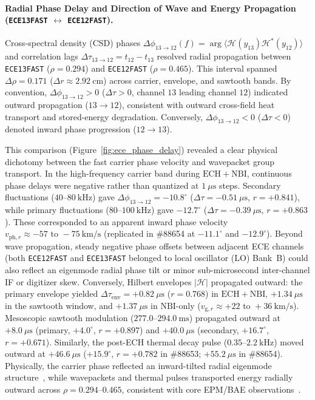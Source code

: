 \paragraph*{Radial Phase Delay and Direction of Wave and Energy Propagation (\texttt{ECE13FAST} \texorpdfstring{$\leftrightarrow$}{<->} \texttt{ECE12FAST}).}
Cross-spectral density (CSD) phases $\Delta\phi_{13\to 12}(f) = \arg\langle \mathcal{H}(y_{13})\mathcal{H}^*(y_{12})\rangle$ and correlation lags $\Delta\tau_{13\to 12} = t_{12} - t_{13}$ resolved radial propagation between \texttt{ECE13FAST} ($\rho = 0.294$) and \texttt{ECE12FAST} ($\rho = 0.465$). This interval spanned $\Delta\rho = 0.171$ ($\Delta r \approx 2.92~\mathrm{cm}$) across carrier, envelope, and sawtooth bands. By convention, $\Delta\phi_{13\to 12} > 0$ ($\Delta\tau > 0$, channel $13$ leading channel $12$) indicated outward propagation ($13 \to 12$), consistent with outward cross-field heat transport and stored-energy degradation. Conversely, $\Delta\phi_{13\to 12} < 0$ ($\Delta\tau < 0$) denoted inward phase progression ($12 \to 13$).

This comparison (Figure~\ref{fig:ece_phase_delay}) revealed a clear physical dichotomy between the fast carrier phase velocity and wavepacket group transport. In the high-frequency carrier band during $\mathrm{ECH}+\mathrm{NBI}$, continuous phase delays were negative rather than quantized at $1~\mu\mathrm{s}$ steps. Secondary fluctuations ($40\text{--}80~\mathrm{kHz}$) gave $\Delta\phi_{13\to 12} = -10.8^\circ$ ($\Delta\tau = -0.51~\mu\mathrm{s}$, $r = +0.841$), while primary fluctuations ($80\text{--}100~\mathrm{kHz}$) gave $-12.7^\circ$ ($\Delta\tau = -0.39~\mu\mathrm{s}$, $r = +0.863$). These corresponded to an apparent inward phase velocity $v_{\mathrm{ph},r} \approx -57\text{ to }-75~\mathrm{km/s}$ (replicated in \#88654 at $-11.1^\circ$ and $-12.9^\circ$). Beyond wave propagation, steady negative phase offsets between adjacent ECE channels (both \texttt{ECE12FAST} and \texttt{ECE13FAST} belonged to local oscillator (LO) Bank~B) could also reflect an eigenmode radial phase tilt or minor sub-microsecond inter-channel IF or digitizer skew. Conversely, Hilbert envelopes $|\mathcal{H}|$ propagated outward: the primary envelope yielded $\Delta\tau_{\mathrm{env}} = +0.82~\mu\mathrm{s}$ ($r = 0.768$) in $\mathrm{ECH}+\mathrm{NBI}$, $+1.34~\mu\mathrm{s}$ in the sawtooth window, and $+1.37~\mu\mathrm{s}$ in $\mathrm{NBI}$-only ($v_{\mathrm{g},r} \approx +22\text{ to }+36~\mathrm{km/s}$). Mesoscopic sawtooth modulation ($277.0\text{--}294.0~\mathrm{ms}$) propagated outward at $+8.0~\mu\mathrm{s}$ (primary, $+4.0^\circ$, $r = +0.897$) and $+40.0~\mu\mathrm{s}$ (secondary, $+16.7^\circ$, $r = +0.671$). Similarly, the post-ECH thermal decay pulse ($0.35\text{--}2.2~\mathrm{kHz}$) moved outward at $+46.6~\mu\mathrm{s}$ ($+15.9^\circ$, $r = +0.782$ in \#88653; $+55.2~\mu\mathrm{s}$ in \#88654). Physically, the carrier phase reflected an inward-tilted radial eigenmode structure~\cite{zang2019observation,Zhong2024,luo2020measurement}, while wavepackets and thermal pulses transported energy radially outward across $\rho = 0.294\text{--}0.465$, consistent with core EPM/BAE observations~\cite{Weir2019,Kin2025}.

